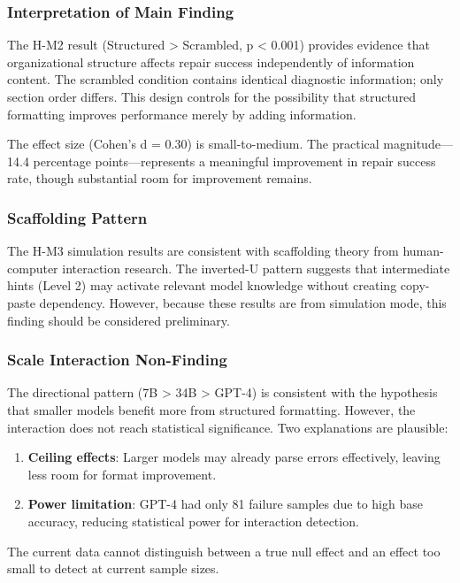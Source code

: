 
\subsubsection{Interpretation of Main Finding}

The H-M2 result (Structured > Scrambled, p < 0.001) provides evidence that organizational structure affects repair success independently of information content. The scrambled condition contains identical diagnostic information; only section order differs. This design controls for the possibility that structured formatting improves performance merely by adding information.

The effect size (Cohen's d = 0.30) is small-to-medium. The practical magnitude---14.4 percentage points---represents a meaningful improvement in repair success rate, though substantial room for improvement remains.

\subsubsection{Scaffolding Pattern}

The H-M3 simulation results are consistent with scaffolding theory from human-computer interaction research. The inverted-U pattern suggests that intermediate hints (Level 2) may activate relevant model knowledge without creating copy-paste dependency. However, because these results are from simulation mode, this finding should be considered preliminary.

\subsubsection{Scale Interaction Non-Finding}

The directional pattern (7B > 34B > GPT-4) is consistent with the hypothesis that smaller models benefit more from structured formatting. However, the interaction does not reach statistical significance. Two explanations are plausible:

\begin{enumerate}
\item \textbf{Ceiling effects}: Larger models may already parse errors effectively, leaving less room for format improvement.
\item \textbf{Power limitation}: GPT-4 had only 81 failure samples due to high base accuracy, reducing statistical power for interaction detection.
\end{enumerate}

The current data cannot distinguish between a true null effect and an effect too small to detect at current sample sizes.

